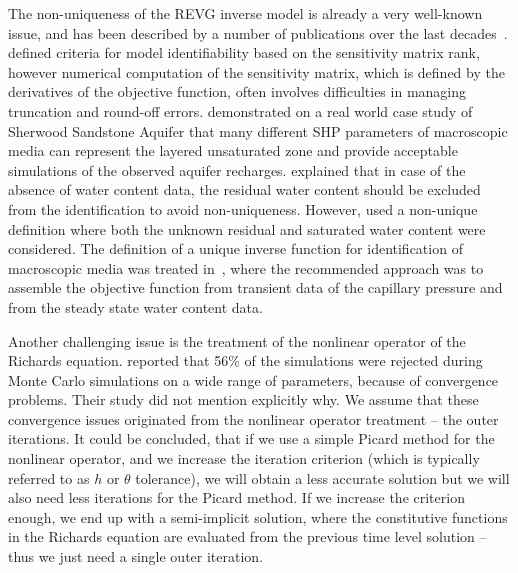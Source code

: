 \documentclass[review]{elsarticle}
\begin{document}
The non-uniqueness of the REVG inverse model is already a very well-known issue, and has been described by a number of publications over the last decades~\citep{kool1985, mous1993, ihlwang2003, beven2003-uncertain,Kowalsky04,Nakhaei, Kamali,pena17}.%
\cite{mous1993} defined criteria for model identifiability based on the sensitivity matrix rank, however numerical computation of the sensitivity matrix, which is defined by the derivatives of the objective function, often involves difficulties in managing truncation and round-off errors.
\cite{beven2003-uncertain} demonstrated on a real world case study of Sherwood Sandstone Aquifer that many different SHP parameters of macroscopic media can represent the layered unsaturated zone and provide acceptable simulations of the observed aquifer recharges.  \cite{mous1993} explained that in case of the absence of water content data, the residual water content should be excluded from the identification to avoid non-uniqueness. However, \cite{beven2003-uncertain} used
a non-unique definition where both the unknown residual and saturated water content were considered.
The definition of a unique inverse function for identification of macroscopic media was treated in~\citep{zou200126}, where the recommended approach was to assemble the objective function from transient data of the capillary pressure and from the steady state water content data. %

Another challenging issue is the treatment of the nonlinear operator of the Richards equation. \cite{beven2003-uncertain} reported that 56\% of the simulations were rejected during Monte Carlo simulations on a wide range of parameters, because of convergence problems. 
Their study did not mention explicitly why. We assume that these convergence issues originated from the nonlinear operator treatment -- the outer iterations.
It could be concluded, that if we use a simple Picard method for the nonlinear operator, and we increase the iteration criterion (which is typically referred to as $h$ or $\theta$ tolerance), we will obtain a less accurate solution but we will also need less iterations for the Picard method. If we increase the criterion enough, we end up with a semi-implicit solution, where the constitutive functions in the Richards equation are evaluated from the previous time level solution -- thus we just need a single outer iteration.
\end{document}
